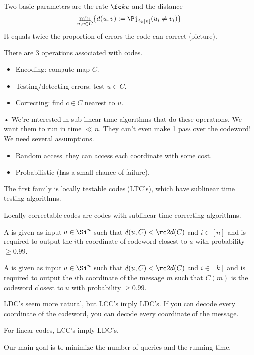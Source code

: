 Two basic parameters are the rate $\fc kn$ and the distance
\[
\min_{u,v\in C} \{d(u,v):=\Pj_{i\in [n]}(u_i\ne v_i)\}
\]
It equals twice the proportion of errors the code can correct (picture).

There are 3 operations associated with  codes.
\begin{itemize}
\item
Encoding: compute map $C$. %
\item
Testing/detecting errors: test $u\in C$.
\item 
Correcting: find $c\in C$ nearest to $u$.
\end{itemize}•
We're interested in sub-linear time algorithms that do these operations. We want them to run in time $\ll n$. They can't even make 1 pass over the codeword! We need several assumptions.
\begin{itemize}
\item
Random access: they can access each coordinate with some cost.
\item
Probabilistic (has a small chance of failure).
\end{itemize}
The first family is locally testable codes (LTC's), which have sublinear time testing algorithms.
Locally correctable codes are codes with sublinear time correcting algorithms. 
\begin{df}
A  is given as input $u\in \Si^n$ such that $d(u,C)<\rc2d(C)$ and $i\in [n]$ and is required to output the $i$th coordinate of codeword closest to $u$ with probability $\ge 0.99$.
\end{df}
\begin{df}
A  is given as input $u\in \Si^n$ such that $d(u,C)<\rc2d(C)$ and $i\in [k]$ and is required to output the $i$th coordinate of the message $m$ such that $C(m)$ is the codeword closest to $u$ with probability $\ge 0.99$.
\end{df}
LDC's seem more natural, but LCC's imply LDC's.
If you can decode every coordinate of the codeword, you can decode every coordinate of the message.
\begin{fct}
For linear codes, LCC's imply LDC's.
\end{fct}
Our main goal is to minimize the number of queries and the running time. 

